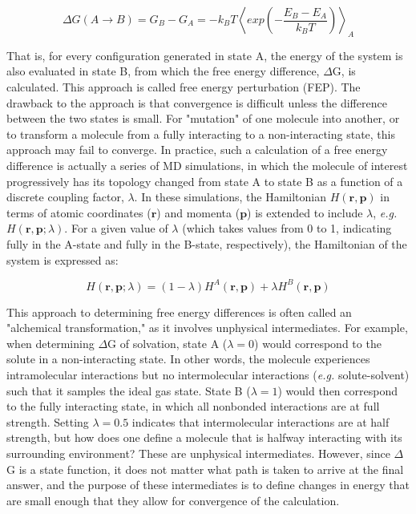 \documentclass[9pt,tutorial]{livecoms}
\begin{document}
\begin{equation} \label{fep_eq}
\Delta G(A \longrightarrow B) = G_B - G_A = -k_B T \left \langle exp \left(-\frac{E_B - E_A}{k_B T}\right)\right \rangle_A
\end{equation}

That is, for every configuration generated in state A, the energy of the system is also evaluated in state B, from which the free energy difference, $\Delta$G, is calculated. This approach is called free energy perturbation (FEP). The drawback to the approach is that convergence is difficult unless the difference between the two states is small. For "mutation" of one molecule into another, or to transform a molecule from a fully interacting to a non-interacting state, this approach may fail to converge. In practice, such a calculation of a free energy difference is actually a series of MD simulations, in which the molecule of interest progressively has its topology changed from state A to state B as a function of a discrete coupling factor, $\lambda$. In these simulations, the Hamiltonian $H(\mathbf{r}, \mathbf{p})$ in terms of atomic coordinates ($\mathbf{r}$) and momenta ($\mathbf{p}$) is extended to include $\lambda$, {\em e.g.} $H(\mathbf{r}, \mathbf{p}; \lambda)$. For a given value of $\lambda$ (which takes values from 0 to 1, indicating fully in the A-state and fully in the B-state, respectively), the Hamiltonian of the system is expressed as:

\begin{equation} \label{fes_hamiltonian_eq}
H(\mathbf{r},\mathbf{p};\lambda) = (1 - \lambda) H^A(\mathbf{r},\mathbf{p}) + \lambda H^B(\mathbf{r},\mathbf{p})
\end{equation}

This approach to determining free energy differences is often called an "alchemical transformation," as it involves unphysical intermediates. For example, when determining $\Delta$G of solvation, state A ($\lambda = 0$) would correspond to the solute in a non-interacting state. In other words, the molecule experiences intramolecular interactions but no intermolecular interactions ({\em e.g.} solute-solvent) such that it samples the ideal gas state. State B ($\lambda = 1$) would then correspond to the fully interacting state, in which all nonbonded interactions are at full strength. Setting $\lambda = 0.5$ indicates that intermolecular interactions are at half strength, but how does one define a molecule that is halfway interacting with its surrounding environment? These are unphysical intermediates. However, since $\Delta$G is a state function, it does not matter what path is taken to arrive at the final answer, and the purpose of these intermediates is to define changes in energy that are small enough that they allow for convergence of the calculation.
\end{document}
